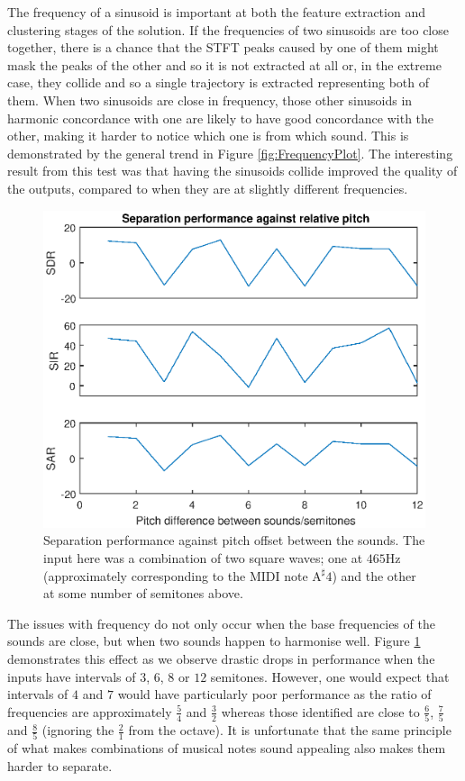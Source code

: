 \documentclass[10pt,twoside,a4paper]{report}
\begin{document}
The frequency of a sinusoid is important at both the feature extraction and clustering stages of the solution. If the frequencies of two sinusoids are too close together, there is a chance that the STFT peaks caused by one of them might mask the peaks of the other and so it is not extracted at all or, in the extreme case, they collide and so a single trajectory is extracted representing both of them. When two sinusoids are close in frequency, those other sinusoids in harmonic concordance with one are likely to have good concordance with the other, making it harder to notice which one is from which sound. This is demonstrated by the general trend in Figure \ref{fig:FrequencyPlot}. The interesting result from this test was that having the sinusoids collide improved the quality of the outputs, compared to when they are at slightly different frequencies.


\begin{figure}
\centering
\includegraphics[width=0.7\linewidth]{./PitchPlot}
\caption{Separation performance against pitch offset between the sounds. The input here was a combination of two square waves; one at $ 465 $Hz (approximately corresponding to the MIDI note $ \mathrm{A}^\sharp 4 $) and the other at some number of semitones above.}
\label{fig:PitchPlot}
\end{figure}

The issues with frequency do not only occur when the base frequencies of the sounds are close, but when two sounds happen to harmonise well. Figure \ref{fig:PitchPlot} demonstrates this effect as we observe drastic drops in performance when the inputs have intervals of $ 3 $, $ 6 $, $ 8 $ or $ 12 $ semitones. However, one would expect that intervals of $ 4 $ and $ 7 $ would have particularly poor performance as the ratio of frequencies are approximately $ \frac{5}{4} $ and $ \frac{3}{2} $ whereas those identified are close to $ \frac{6}{5} $, $ \frac{7}{5} $ and $ \frac{8}{5} $ (ignoring the $ \frac{2}{1} $ from the octave). It is unfortunate that the same principle of what makes combinations of musical notes sound appealing also makes them harder to separate.
\end{document}

